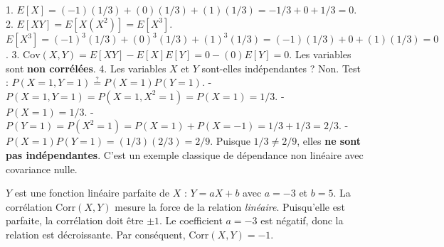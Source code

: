 \begin{correctionbox}
1.  $E[X] = (-1)(1/3) + (0)(1/3) + (1)(1/3) = -1/3 + 0 + 1/3 = 0$.
2.  $E[XY] = E[X(X^2)] = E[X^3]$.
    $E[X^3] = (-1)^3(1/3) + (0)^3(1/3) + (1)^3(1/3) = (-1)(1/3) + 0 + (1)(1/3) = 0$.
3.  $\text{Cov}(X,Y) = E[XY] - E[X]E[Y] = 0 - (0)E[Y] = 0$.
    Les variables sont \textbf{non corrélées}.
4.  Les variables $X$ et $Y$ sont-elles indépendantes ? Non.
    Test : $P(X=1, Y=1) \stackrel{?}{=} P(X=1)P(Y=1)$.
    - $P(X=1, Y=1) = P(X=1, X^2=1) = P(X=1) = 1/3$.
    - $P(X=1) = 1/3$.
    - $P(Y=1) = P(X^2=1) = P(X=1) + P(X=-1) = 1/3 + 1/3 = 2/3$.
    - $P(X=1)P(Y=1) = (1/3)(2/3) = 2/9$.
    Puisque $1/3 \neq 2/9$, elles \textbf{ne sont pas indépendantes}.
    C'est un exemple classique de dépendance non linéaire avec covariance nulle.
\end{correctionbox}

\begin{correctionbox}
$Y$ est une fonction linéaire parfaite de $X$ : $Y = aX + b$ avec $a=-3$ et $b=5$.
La corrélation $\text{Corr}(X,Y)$ mesure la force de la relation \textit{linéaire}. Puisqu'elle est parfaite, la corrélation doit être $\pm 1$.
Le coefficient $a = -3$ est négatif, donc la relation est décroissante.
Par conséquent, $\text{Corr}(X,Y) = -1$.
\end{correctionbox}